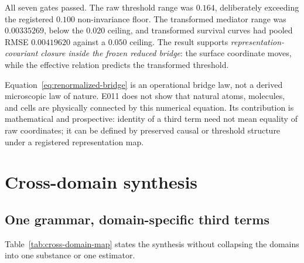 \documentclass[11pt,a4paper]{article}
\begin{document}
All seven gates passed. The raw threshold range was $0.164$, deliberately exceeding the registered $0.100$ non-invariance floor. The transformed mediator range was $0.00335269$, below the $0.020$ ceiling, and transformed survival curves had pooled RMSE $0.00419620$ against a $0.050$ ceiling. The result supports \emph{representation-covariant closure inside the frozen reduced bridge}: the surface coordinate moves, while the effective relation predicts the transformed threshold.

Equation~\eqref{eq:renormalized-bridge} is an operational bridge law, not a derived microscopic law of nature. E011 does not show that natural atoms, molecules, and cells are physically connected by this numerical equation. Its contribution is mathematical and prospective: identity of a third term need not mean equality of raw coordinates; it can be defined by preserved causal or threshold structure under a registered representation map.

\section{Cross-domain synthesis}

\subsection{One grammar, domain-specific third terms}

Table~\ref{tab:cross-domain-map} states the synthesis without collapsing the domains into one substance or one estimator.
\end{document}

